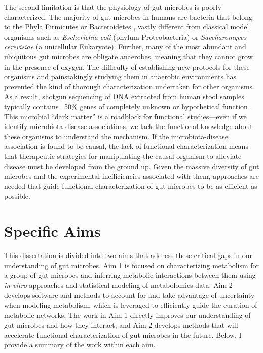 \documentclass[11pt,onecolumn,notitlepage,openany,twoside]{book}
\begin{document}
\begin{refsection}
The second limitation is that the physiology of gut microbes is poorly characterized. The majority of gut microbes in humans are bacteria that belong to the Phyla Firmicutes or Bacteroidetes \cite{Turnbaugh2007-cd}, vastly different from classical model organisms such as \textit{Escherichia coli} (phylum Proteobacteria) or \textit{Saccharomyces cerevisiae} (a unicellular Eukaryote). Further, many of the most abundant and ubiquitous gut microbes are obligate anaerobes, meaning that they cannot grow in the presence of oxygen. The difficulty of establishing new protocols for these organisms and painstakingly studying them in anaerobic environments has prevented the kind of thorough characterization undertaken for other organisms. As a result, shotgun sequencing of DNA extracted from human stool samples typically contains ~50\% genes of completely unknown or hypothetical function \cite{Joice2014-tp}. This microbial “dark matter” is a roadblock for functional studies---even if we identify microbiota-disease associations, we lack the functional knowledge about these organisms to understand the mechanism. If the microbiota-disease association is found to be causal, the lack of functional characterization means that therapeutic strategies for manipulating the causal organism to alleviate disease must be developed from the ground up. Given the massive diversity of gut microbes and the experimental inefficiencies associated with them, approaches are needed that guide functional characterization of gut microbes to be as efficient as possible.

\section{Specific Aims}

This dissertation is divided into two aims that address these critical gaps in our understanding of gut microbes. Aim 1 is focused on characterizing metabolism for a group of gut microbes and inferring metabolic interactions between them using \textit{in vitro} approaches and statistical modeling of metabolomics data. Aim 2 develops software and methods to account for and take advantage of uncertainty when modeling metabolism, which is leveraged to efficiently guide the curation of metabolic networks. The work in Aim 1 directly improves our understanding of gut microbes and how they interact, and Aim 2 develops methods that will accelerate functional characterization of gut microbes in the future. Below, I provide a summary of the work within each aim.
\\[12pt]



\end{refsection}
\end{document}

